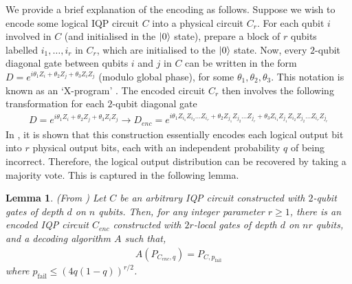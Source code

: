 \documentclass[a4paper,onecolumn,11pt,accepted=2017-05-09]{quantumarticle}
\newcommand{\pfail}{p_{\text{fail}}}
\newtheorem{lemma}[theorem]{Lemma}
\begin{document}
We provide a brief explanation of the encoding as follows. Suppose we wish to encode some logical IQP circuit $C$ into a physical circuit $C_{r}$. For each qubit $i$ involved in $C$ (and initialised in the $\ket{0}$ state), prepare a block of $r$ qubits labelled $i_1,\ldots, i_r$ in $C_{r}$, which are initialised to the $\ket{0}$ state. Now, every $2$-qubit diagonal gate between qubits $i$ and $j$ in $C$ can be written in the form $D = e^{i \theta_1 Z_i + \theta_2 Z_j + \theta_3 Z_iZ_j}$ (modulo global phase), for some $\theta_1,\theta_2,\theta_3$. This notation is known as an `X-program' \cite{shepherd_2009, shepherd2010binary, shepherd2010quantum,  Bremner_2017, gross2023secret}. 
The encoded circuit $C_{r}$ then involves the following transformation for each $2$-qubit diagonal gate
\begin{align}
    D = e^{i \theta_1 Z_i + \theta_2 Z_j + \theta_3 Z_iZ_j} \to D_{enc} = e^{i \theta_1  Z_{i_1}Z_{i_2}\ldots Z_{i_r} + \theta_2 Z_{j_1}Z_{j_2}\ldots Z_{j_r} + \theta_3 Z_{i_1}Z_{j_1}Z_{i_2}Z_{j_2}\ldots Z_{i_r}Z_{j_r}} \label{Eq:Transform}
\end{align}
In \citeauthor{Bremner_2017}, it is shown that this construction essentially encodes each logical output bit into $r$ physical output bits, each with an independent probability $q$ of being incorrect. 
Therefore, the logical output distribution can be recovered by taking a majority vote. 
This is captured in the following lemma.

\begin{lemma} (From \cite{Bremner_2017}) \label{Lemma:BMS}
Let $C$ be an arbitrary IQP circuit constructed with $2$-qubit gates of depth $d$ on $n$ qubits. Then, for any integer parameter $r \geq 1$, there is an encoded IQP circuit $C_{enc}$ constructed with $2r$-local gates of depth $d$ on $nr$ qubits, and a decoding algorithm $A$ such that,
\begin{align}
    A(P_{C_{enc},q}) = P_{C,\pfail}
\end{align}
where $\pfail \leq (4q(1-q))^{r/2}$.
\end{lemma}
\end{document}
